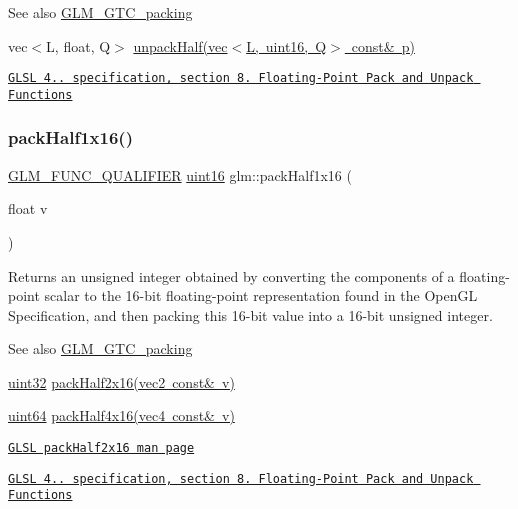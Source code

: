 \begin{DoxySeeAlso}{See also}
\mbox{\hyperlink{group__gtc__packing}{G\+L\+M\+\_\+\+G\+T\+C\+\_\+packing}} 

vec$<$\+L, float, Q$>$ \mbox{\hyperlink{group__gtc__packing_ga30d6b2f1806315bcd6047131f547d33b}{unpack\+Half(vec$<$\+L, uint16, Q$>$ const\& p)}} 

\href{http://www.opengl.org/registry/doc/GLSLangSpec.4.20.8.pdf}{\tt G\+L\+SL 4.. specification, section 8. Floating-\/\+Point Pack and Unpack Functions} 
\end{DoxySeeAlso}
\mbox{\label{group__gtc__packing_gaba534b320836a35372e00af5771dd1a2}} 
\subsubsection{\texorpdfstring{pack\+Half1x16()}{packHalf1x16()}}
{\footnotesize\ttfamily \mbox{\hyperlink{setup_8hpp_a33fdea6f91c5f834105f7415e2a64407}{G\+L\+M\+\_\+\+F\+U\+N\+C\+\_\+\+Q\+U\+A\+L\+I\+F\+I\+ER}} \mbox{\hyperlink{group__gtc__type__precision_gad8c2939e1fdd8e5828b31d95c52255d5}{uint16}} glm\+::pack\+Half1x16 (\begin{DoxyParamCaption}\item[{float}]{v }\end{DoxyParamCaption})}

Returns an unsigned integer obtained by converting the components of a floating-\/point scalar to the 16-\/bit floating-\/point representation found in the Open\+GL Specification, and then packing this 16-\/bit value into a 16-\/bit unsigned integer.

\begin{DoxySeeAlso}{See also}
\mbox{\hyperlink{group__gtc__packing}{G\+L\+M\+\_\+\+G\+T\+C\+\_\+packing}} 

\mbox{\hyperlink{group__gtc__type__precision_ga202b6a53c105fcb7e531f9b443518451}{uint32}} \mbox{\hyperlink{group__core__func__packing_ga20f134b07db3a3d3a38efb2617388c92}{pack\+Half2x16(vec2 const\& v)}} 

\mbox{\hyperlink{group__gtc__type__precision_gae3632bf9b37da66233d78930dd06378a}{uint64}} \mbox{\hyperlink{group__gtc__packing_ga8104f0b719b7792491f2b789a6dd6f96}{pack\+Half4x16(vec4 const\& v)}} 

\href{http://www.opengl.org/sdk/docs/manglsl/xhtml/packHalf2x16.xml}{\tt G\+L\+SL pack\+Half2x16 man page} 

\href{http://www.opengl.org/registry/doc/GLSLangSpec.4.20.8.pdf}{\tt G\+L\+SL 4.. specification, section 8. Floating-\/\+Point Pack and Unpack Functions} 
\end{DoxySeeAlso}
\mbox{\label{group__gtc__packing_ga8104f0b719b7792491f2b789a6dd6f96}} 
